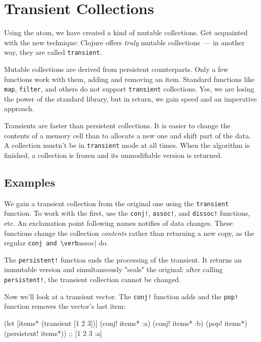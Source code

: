 \fi

\section{Transient Collections}


Using the atom, we have created a kind of mutable collections.
Get acquainted with the new technique: Clojure offers \emph{truly} mutable collections~--- in another way, they are called \verb|transient|.

Mutable collections are derived from persistent counterparts.
Only a few functions work with them, adding and removing an item.
Standard functions like \verb|map|, \verb|filter|, and others do not support \verb|transient| collections.
Yes, we are losing the power of the standard library, but in return, we gain speed and an imperative approach.

Transients are faster than persistent collections.
It is easier to change the contents of a memory cell than to allocate a new one and shift part of the data.
A collection mustn't be in \verb|transient| mode at all times.
When the algorithm is finished, a collection is frozen and its unmodifiable version is returned.

\subsection{Examples}

We gain a transient collection from the original one using the \verb|transient| function.
To work with the first, use the \verb|conj!|, \verb|assoc!|, and \verb|dissoc!| functions, etc.
An exclamation point following names notifies of data changes.
These functions change the collection \emph{contents} rather than returning a new copy, as the regular \verb|conj and \verb|assoc| do.


The \verb|persistent!| function ends the processing of the transient.
It returns an immutable version and simultaneously "seals" the original: after calling \verb|persistent!|, the transient collection cannot be changed.

Now we'll look at a transient vector.
The \verb|conj!| function adds and the \verb|pop!| function removes the vector's last item:

\begin{english}
  \begin{clojure}
(let [items* (transient [1 2 3])]
  (conj! items* :a)
  (conj! items* :b)
  (pop! items*)
  (persistent! items*))
;; [1 2 3 :a]
  \end{clojure}
\end{english}

